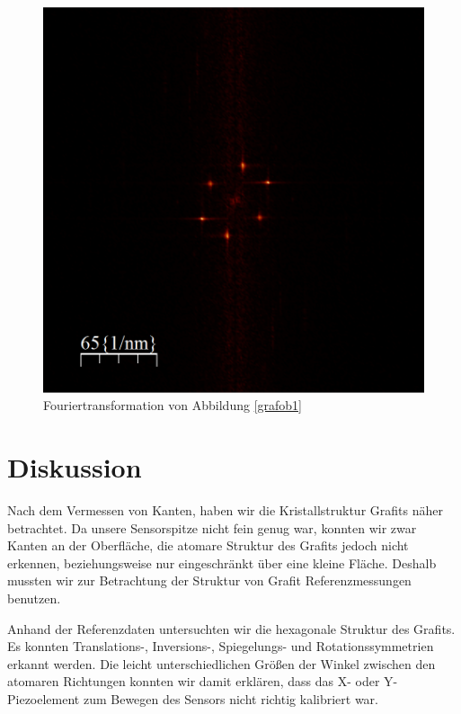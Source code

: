 \documentclass[10pt,a4paper]{article}
\begin{document}
\begin{figure}[h]
	\centering
	
	\includegraphics[scale = 0.5]{Fouriertrasformation_kristall.png}
	
	\caption{Fouriertransformation von Abbildung \ref{grafob1}}
	\label{fouriertansformation_ebene}
\end{figure}

\section{Diskussion}

Nach dem Vermessen von Kanten, haben wir die Kristallstruktur Grafits näher betrachtet. Da unsere Sensorspitze nicht fein genug war, konnten wir zwar Kanten an der Oberfläche, die atomare Struktur des Grafits jedoch nicht erkennen, beziehungsweise nur eingeschränkt über eine kleine Fläche. Deshalb mussten wir zur Betrachtung der Struktur von Grafit Referenzmessungen benutzen.

Anhand der Referenzdaten untersuchten wir die hexagonale Struktur des Grafits. Es konnten Translations-, Inversions-, Spiegelungs- und Rotationssymmetrien erkannt werden. Die leicht unterschiedlichen Größen der Winkel zwischen den atomaren Richtungen konnten wir damit erklären, dass das X- oder Y-Piezoelement zum Bewegen des Sensors nicht richtig kalibriert war.
\end{document}
